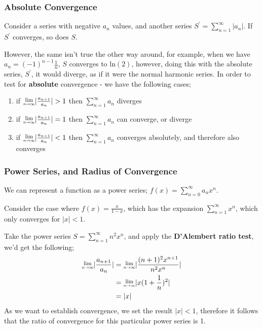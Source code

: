 \documentclass[a4paper, 12pt]{article}
\newcommand{\limit}[2]{\raisebox{0.5ex}{\scalebox{0.8}{$\displaystyle{\lim_{#1 \to #2}}$}}}
\newcommand{\summation}[3]{\sum\limits_{#1}^{#2} #3}
\begin{document}
            \subsubsection*{Absolute Convergence}
                Consider a series with negative $a_n$ values, and another series $S^\prime = \summation{n = 1}{\infty}{|a_n|}$. If $S^\prime$ converges, so does $S$.
                \smallskip

                However, the same isn't true the other way around, for example, when we have $a_n = (-1)^{n - 1} \frac{1}{n}$, $S$ converges to $\text{ln}(2)$, however, doing this with the absolute series, $S^\prime$, it would diverge, as if it were the normal harmonic series. In order to test for \textbf{absolute} convergence - we have the following cases;
                \begin{enumerate}[1.]
                    \itemsep0em
                    \item if $\limit{n}{\infty}|\frac{a_{n + 1}}{a_n}| > 1$ then $\summation{n = 1}{\infty}{a_n}$ diverges
                    \item if $\limit{n}{\infty}|\frac{a_{n + 1}}{a_n}| = 1$ then $\summation{n = 1}{\infty}{a_n}$ can converge, or diverge
                    \item if $\limit{n}{\infty}|\frac{a_{n + 1}}{a_n}| < 1$ then $\summation{n = 1}{\infty}{a_n}$ converges absolutely, and therefore also converges
                \end{enumerate}
            \subsubsection*{Power Series, and Radius of Convergence}
                We can represent a function as a power series; $f(x) = \summation{n = 0}{\infty}{a_nx^n}$.
                \smallskip

                Consider the case where $f(x) = \frac{x}{1 - x}$, which has the expansion $\summation{n = 1}{\infty}{x^n}$, which only converges for $|x| < 1$.
                \smallskip

                Take the power series $S = \summation{n = 1}{\infty}{n^2 x^n}$, and apply the \textbf{D'Alembert ratio test}, we'd get the following;
                \begin{align*}
                    \limit{n}{\infty} |\frac{a_{n + 1}}{a_n}| & = \limit{n}{\infty}|\frac{(n + 1)^2 x^{n + 1}}{n^2 x^n}| \\
                    & = \limit{n}{\infty} |x(1 + \frac{1}{n})^2| \\
                    & = |x|
                \end{align*}
                As we want to establish convergence, we set the result $|x| < 1$, therefore it follows that the ratio of convergence for this particular power series is 1.
\end{document}

